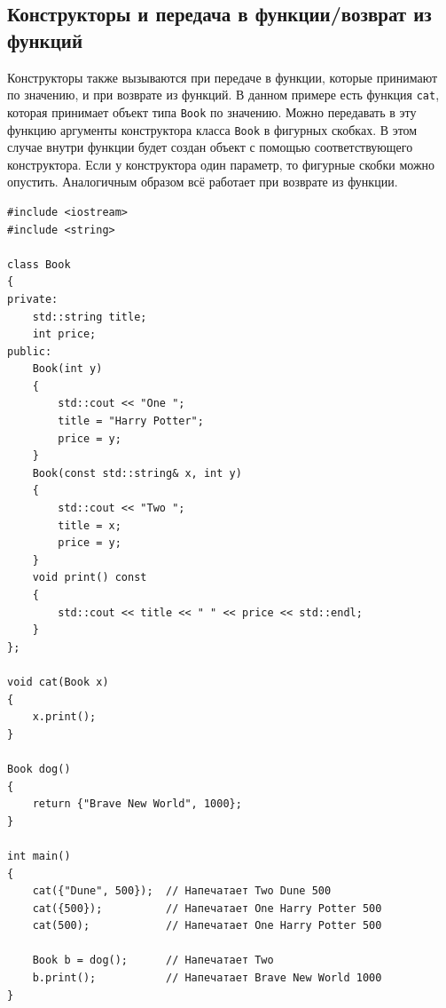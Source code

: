 \documentclass{article}
\begin{document}
\subsection*{Конструкторы и передача в функции/возврат из функций}
Конструкторы также вызываются при передаче в функции, которые принимают по значению, и при возврате из функций. В данном примере есть функция \texttt{cat}, которая принимает объект типа \texttt{Book} по значению. Можно передавать в эту функцию аргументы конструктора класса \texttt{Book} в фигурных скобках. В этом случае внутри функции будет создан объект с помощью соответствующего конструктора. Если у конструктора один параметр, то фигурные скобки можно опустить. Аналогичным образом всё работает при возврате из функции. 
\begin{lstlisting}
#include <iostream>
#include <string>

class Book 
{
private:
    std::string title;
    int price;
public:
	Book(int y)
	{
		std::cout << "One ";
		title = "Harry Potter";
		price = y;
	}
	Book(const std::string& x, int y)
	{
		std::cout << "Two ";
		title = x;
		price = y;
	}
    void print() const
    {
        std::cout << title << " " << price << std::endl;
    }
};

void cat(Book x)
{
	x.print();
}

Book dog()
{
	return {"Brave New World", 1000};
}

int main() 
{
	cat({"Dune", 500});  // Напечатает Two Dune 500
	cat({500});          // Напечатает One Harry Potter 500
	cat(500);            // Напечатает One Harry Potter 500
	
	Book b = dog();      // Напечатает Two
	b.print();           // Напечатает Brave New World 1000
}
\end{lstlisting}
\end{document}
